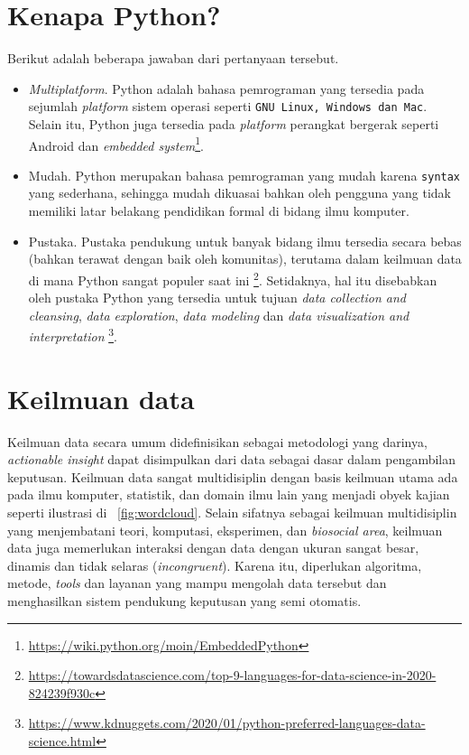 \section{Kenapa Python?}
Berikut adalah beberapa jawaban dari pertanyaan tersebut.
\begin{itemize}
  \item \textit{Multiplatform}. Python adalah bahasa pemrograman yang tersedia pada sejumlah \textit{platform} sistem operasi seperti \texttt{GNU Linux, Windows dan Mac}. Selain itu, Python juga tersedia pada \textit{platform} perangkat bergerak seperti Android dan \textit{embedded system}\footnote{\url{https://wiki.python.org/moin/EmbeddedPython}}.
  \item Mudah. Python merupakan bahasa pemrograman yang mudah karena \texttt{syntax} yang sederhana, sehingga mudah dikuasai bahkan oleh pengguna yang tidak memiliki latar belakang pendidikan formal di bidang ilmu komputer.
  \item Pustaka. Pustaka pendukung untuk banyak bidang ilmu tersedia secara bebas (bahkan terawat dengan baik oleh komunitas), terutama dalam keilmuan data di mana Python sangat populer saat ini \footnote{\url{https://towardsdatascience.com/top-9-languages-for-data-science-in-2020-824239f930c}}. Setidaknya, hal itu disebabkan oleh pustaka Python yang tersedia untuk tujuan \textit{data collection and cleansing}, \textit{data exploration}, \textit{data modeling} dan \textit{data visualization and interpretation} \footnote{\url{https://www.kdnuggets.com/2020/01/python-preferred-languages-data-science.html}}.
\end{itemize}

\section{Keilmuan data}
Keilmuan data secara umum didefinisikan sebagai metodologi yang darinya, \textit{actionable insight} dapat disimpulkan dari data sebagai dasar dalam pengambilan keputusan\cite{igual2017introduction}. Keilmuan data sangat multidisiplin dengan basis keilmuan utama ada pada ilmu komputer, statistik, dan domain ilmu lain yang menjadi obyek kajian\cite{skiena2017data} seperti ilustrasi di \figurename~\ref{fig:wordcloud}. Selain sifatnya sebagai keilmuan multidisiplin yang menjembatani teori, komputasi, eksperimen, dan \textit{biosocial area}, keilmuan data juga memerlukan interaksi dengan data dengan ukuran sangat besar, dinamis dan tidak selaras (\textit{incongruent})\cite{dinov2018data}. Karena itu, diperlukan algoritma, metode, \textit{tools} dan layanan yang mampu mengolah data tersebut dan menghasilkan sistem pendukung keputusan yang semi otomatis.

